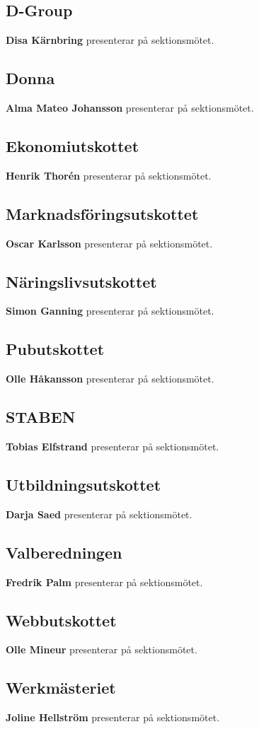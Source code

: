 \documentclass[../protokoll_hostmote_2021.tex]{subfiles}
\begin{document}
\subsection{D-Group}
\textbf{Disa Kärnbring} presenterar på sektionsmötet.



\subsection{Donna}
\textbf{Alma Mateo Johansson} presenterar på sektionsmötet.



\subsection{Ekonomiutskottet}
\textbf{Henrik Thorén} presenterar på sektionsmötet.



\subsection{Marknadsföringsutskottet}
\textbf{Oscar Karlsson} presenterar på sektionsmötet.



\subsection{Näringslivsutskottet}
\textbf{Simon Ganning} presenterar på sektionsmötet.



\subsection{Pubutskottet}
\textbf{Olle Håkansson} presenterar på sektionsmötet.



\subsection{STABEN}
\textbf{Tobias Elfstrand} presenterar på sektionsmötet.



\subsection{Utbildningsutskottet}
\textbf{Darja Saed} presenterar på sektionsmötet. 


 
\subsection{Valberedningen}
\textbf{Fredrik Palm} presenterar på sektionsmötet.



\subsection{Webbutskottet}
\textbf{Olle Mineur} presenterar på sektionsmötet.



\subsection{Werkmästeriet}
\textbf{Joline Hellström} presenterar på sektionsmötet.
\end{document}
